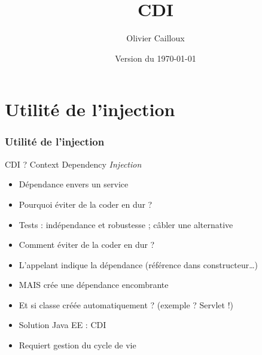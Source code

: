 \documentclass[english, french]{beamer}
\title{CDI}
\subtitle{}
\author{Olivier Cailloux}
\institute[LAMSADE]{LAMSADE, Université Paris-Dauphine}
\date{Version du \today}
\begin{document}


\begin{frame}[plain]
   \titlepage
\end{frame}
\addtocounter{framenumber}{-1}

\section{Utilité de l’injection}
\begin{frame}
	\frametitle{Utilité de l’injection}
	CDI ? \pause Context Dependency \emph{Injection}\pause
	\begin{itemize}
		\item Dépendance envers un service
		\item Pourquoi éviter de la coder en dur ? \pause
		\item Tests : indépendance et robustesse ; câbler une alternative \pause
		\item Comment éviter de la coder en dur ? \pause
		\item L’appelant indique la dépendance (référence dans constructeur…) \pause
		\item MAIS crée une dépendance encombrante
		\item Et si classe créée automatiquement ? (exemple ? \pause Servlet !)
		\item Solution Java EE : CDI
		\item Requiert gestion du cycle de vie
	\end{itemize}
\end{frame}
\end{document}
